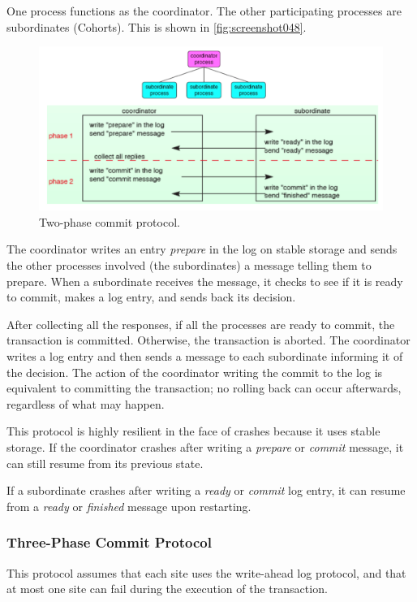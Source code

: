 One process functions as the coordinator. The other participating processes are subordinates (Cohorts). This is shown in \autoref{fig:screenshot048}.

\begin{figure}
\centering
\includegraphics[width=0.7\linewidth]{figures/screenshot048}
\caption{Two-phase commit protocol.}
\label{fig:screenshot048}
\end{figure}

The coordinator writes an entry \textit{prepare} in the log on stable storage and sends the other processes involved (the subordinates) a message telling them to prepare. When a subordinate receives the message, it checks to see if it is ready to commit, makes a log entry, and sends back its decision. 

After collecting all the responses, if all the processes are ready to commit, the transaction is committed. Otherwise, the transaction is aborted. The coordinator writes a log entry and then sends a message to each subordinate informing it of the decision. The action of the coordinator writing the commit to the log is equivalent to committing the transaction; no rolling back can occur afterwards, regardless of what may happen.

This protocol is highly resilient in the face of crashes because it uses stable storage. If the coordinator crashes after writing a \textit{prepare} or \textit{commit} message, it can still resume from its previous state.

If a subordinate crashes after writing a \textit{ready} or \textit{commit} log entry, it can resume from a \textit{ready} or \textit{finished} message upon restarting.

\subsubsection{Three-Phase Commit Protocol}
This protocol assumes that each site uses the write-ahead log protocol, and that at most one site can fail during the execution of the transaction.

